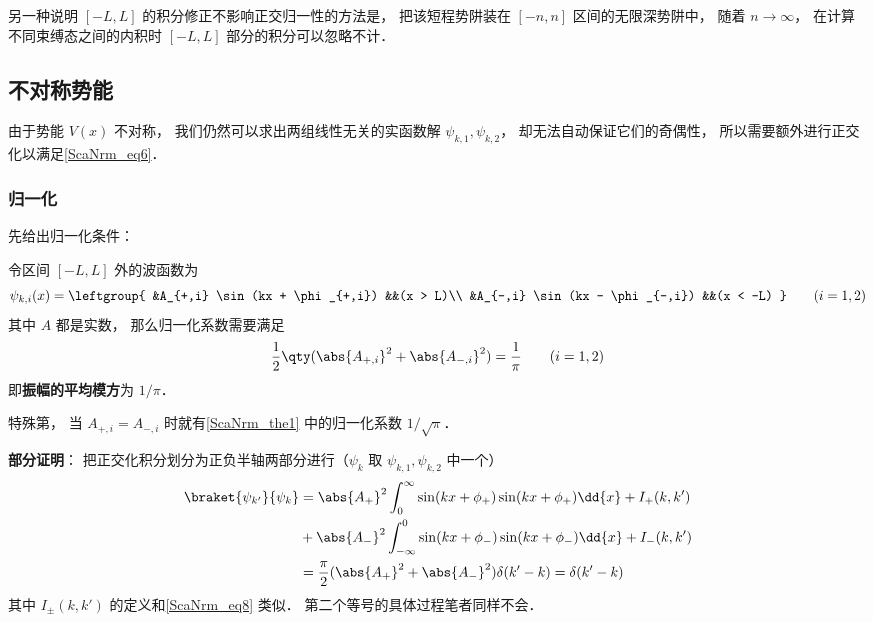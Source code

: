 另一种说明 $[-L,L]$ 的积分修正不影响正交归一性的方法是， 把该短程势阱装在 $[-n,n]$ 区间的无限深势阱中， 随着 $n\to\infty$， 在计算不同束缚态之间的内积时 $[-L,L]$ 部分的积分可以忽略不计．

\subsection{不对称势能}
由于势能 $V(x)$ 不对称， 我们仍然可以求出两组线性无关的实函数解 $\psi_{k,1},\psi_{k,2}$， 却无法自动保证它们的奇偶性， 所以需要额外进行正交化以满足\autoref{ScaNrm_eq6}．
\subsubsection{归一化}
先给出归一化条件：
\begin{theorem}{}
令区间 $[-L,L]$ 外的波函数为
\begin{equation}\label{ScaNrm_eq9}
\psi_{k,i}(x) = \leftgroup{
    &A_{+,i} \sin(kx + \phi_{+,i}) &&(x > L)\\
    &A_{-,i} \sin(kx - \phi_{-,i}) &&(x < -L)
} \qquad (i = 1,2)
\end{equation}
其中 $A$ 都是实数， 那么归一化系数需要满足
\begin{equation}\label{ScaNrm_eq4}
\frac{1}{2}\qty(\abs{A_{+,i}}^2 + \abs{A_{-,i}}^2) = \frac{1}{\pi} \qquad (i = 1,2)
\end{equation}
即\textbf{振幅的平均模方}为 $1/\pi$．
\end{theorem}
特殊第， 当 $A_{+,i} = A_{-,i}$ 时就有\autoref{ScaNrm_the1} 中的归一化系数 $1/\sqrt{\pi}$．

\textbf{部分证明}： 把正交化积分划分为正负半轴两部分进行（$\psi_{k}$ 取 $\psi_{k,1}, \psi_{k,2}$ 中一个）
\begin{equation}
\begin{aligned}
\braket{\psi_{k'}}{\psi_{k}} &=
\abs{A_+}^2\int_0^{\infty} \sin(kx + \phi_{+})\sin(kx + \phi_{+}) \dd{x}   + I_+(k,k')\\
&+ \abs{A_-}^2\int_{-\infty}^0 \sin(kx + \phi_{-})\sin(kx + \phi_{-}) \dd{x} + I_-(k,k')\\
&= \frac{\pi}{2}(\abs{A_+}^2 + \abs{A_-}^2)\delta(k'-k) = \delta(k'-k)
\end{aligned}
\end{equation}
其中 $I_{\pm}(k,k')$ 的定义和\autoref{ScaNrm_eq8} 类似． 第二个等号的具体过程笔者同样不会．

